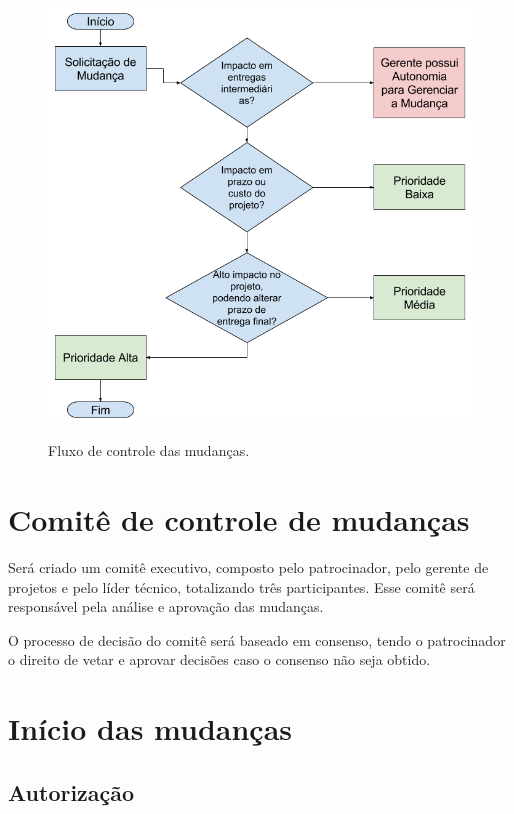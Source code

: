 \begin{figure}[h]
	\includegraphics[width=\textwidth]{images/fluxo-controle-mudancas}
	\label{img:change-control-flow}
	\caption{Fluxo de controle das mudanças.}
\end{figure}

\section{Comitê de controle de mudanças}

Será criado um comitê executivo, composto pelo patrocinador, pelo gerente de projetos e pelo líder técnico, totalizando três participantes. Esse comitê será responsável pela análise e aprovação das mudanças.

O processo de decisão do comitê será baseado em consenso, tendo o patrocinador o direito de vetar e aprovar decisões caso o consenso não seja obtido.

\section{Início das mudanças}

\subsection{Autorização}

